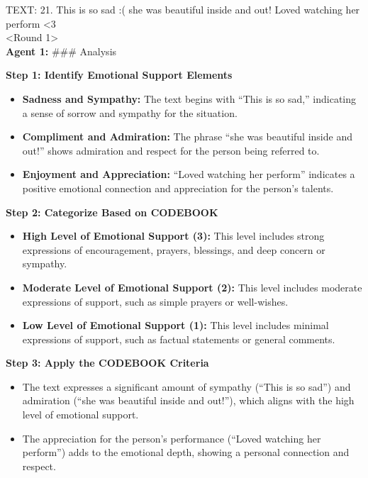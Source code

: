 TEXT: 21. This is so sad :( she was beautiful inside and out! Loved
watching her perform \textless 3\\

<Round 1>\\

\textbf{Agent 1:} \#\#\# Analysis

\textbf{Step 1: Identify Emotional Support Elements}

\begin{itemize}
\tightlist
\item
  \textbf{Sadness and Sympathy:} The text begins with ``This is so
  sad,'' indicating a sense of sorrow and sympathy for the situation.
\item
  \textbf{Compliment and Admiration:} The phrase ``she was beautiful
  inside and out!'' shows admiration and respect for the person being
  referred to.
\item
  \textbf{Enjoyment and Appreciation:} ``Loved watching her perform''
  indicates a positive emotional connection and appreciation for the
  person's talents.
\end{itemize}

\textbf{Step 2: Categorize Based on CODEBOOK}

\begin{itemize}
\tightlist
\item
  \textbf{High Level of Emotional Support (3):} This level includes
  strong expressions of encouragement, prayers, blessings, and deep
  concern or sympathy.
\item
  \textbf{Moderate Level of Emotional Support (2):} This level includes
  moderate expressions of support, such as simple prayers or
  well-wishes.
\item
  \textbf{Low Level of Emotional Support (1):} This level includes
  minimal expressions of support, such as factual statements or general
  comments.
\end{itemize}

\textbf{Step 3: Apply the CODEBOOK Criteria}

\begin{itemize}
\tightlist
\item
  The text expresses a significant amount of sympathy (``This is so
  sad'') and admiration (``she was beautiful inside and out!''), which
  aligns with the high level of emotional support.
\item
  The appreciation for the person's performance (``Loved watching her
  perform'') adds to the emotional depth, showing a personal connection
  and respect.
\end{itemize}


